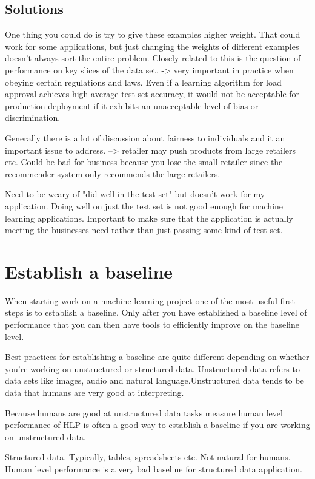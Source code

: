 \subsection{Solutions}
One thing you could do is try to give these examples higher weight.
That could work for some applications, but just changing the weights of different examples doesn't always sort the entire problem.
Closely related to this is the question of performance on key slices of the data set.
-> very important in practice when obeying certain regulations and laws.
Even if a learning algorithm for load approval achieves high average test set accuracy, it would not be acceptable for production deployment if it exhibits an unacceptable level of bias or discrimination.

Generally there is a lot of discussion about fairness to individuals and it an important issue to address.
--> retailer may push products from large retailers etc.
Could be bad for business because you lose the small retailer since the recommender system only recommends the large retailers.

Need to be weary of "did well in the test set" but doesn't work for my application.
Doing well on just the test set is not good enough for machine learning applications.
Important to make sure that the application is actually meeting the businesses need rather than just passing some kind of test set.

\section{Establish a baseline}

When starting work on a machine learning project one of the most useful first steps is to establish a baseline.
Only after you have established a baseline level of performance that you can then have tools to efficiently improve on the baseline level.

Best practices for establishing a baseline are quite different depending on whether you're working on unstructured or structured data.
Unstructured data refers to data sets like images, audio and natural language.Unstructured data tends to be data that humans are very good at interpreting.

Because humans are good at unstructured data tasks measure human level performance of HLP is often a good way to establish a baseline if you are working on unstructured data.

Structured data.
Typically, tables, spreadsheets etc.
Not natural for humans.
Human level performance is a very bad baseline for structured data application.


